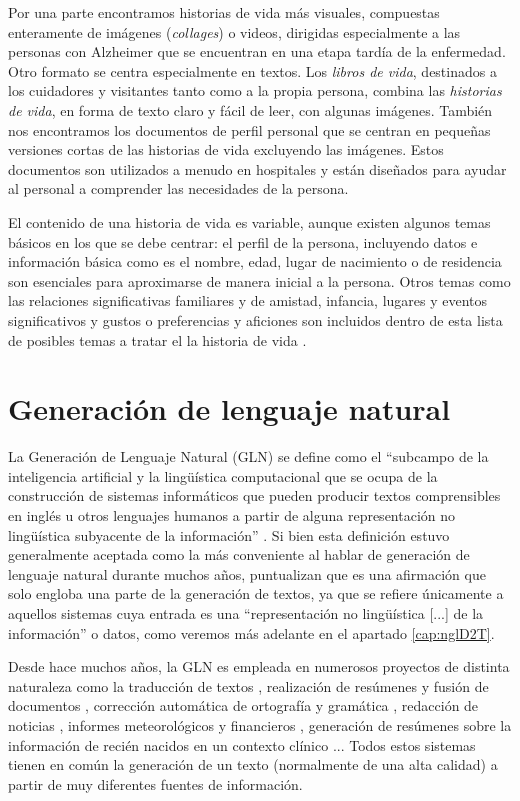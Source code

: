 Por una parte encontramos historias de vida más visuales, compuestas enteramente de imágenes (\textit{collages}) o videos, dirigidas especialmente a las personas con Alzheimer que se encuentran en una etapa tardía de la enfermedad. Otro formato se centra especialmente en textos. Los \textit{libros de vida}, destinados a los cuidadores y visitantes tanto como a la propia persona, combina las \textit{historias de vida}, en forma de texto claro y fácil de leer, con algunas imágenes. También nos encontramos los documentos de perfil personal que se centran en pequeñas versiones cortas de las historias de vida excluyendo las imágenes. Estos documentos son utilizados a menudo en hospitales y están diseñados para ayudar al personal a comprender las necesidades de la persona.

El contenido de una historia de vida es variable, aunque existen algunos temas básicos en los que se debe centrar: el perfil de la persona, incluyendo datos e información básica como es el nombre, edad, lugar de nacimiento o de residencia son esenciales para aproximarse de manera inicial a la persona. Otros temas como las relaciones significativas familiares y de amistad, infancia, lugares y eventos significativos y gustos o preferencias y aficiones son incluidos dentro de esta lista de posibles temas a tratar el la historia de vida \citep{thompsonlifestory}.

\section{Generación de lenguaje natural}

La Generación de Lenguaje Natural (GLN) se define como el ``subcampo de la inteligencia artificial y la lingüística computacional que se ocupa de la construcción de sistemas informáticos que pueden producir textos comprensibles en inglés u otros lenguajes humanos a partir de alguna representación no lingüística subyacente de la información''  \citep{reiter1997building}. Si bien esta definición estuvo generalmente aceptada como la más conveniente al hablar de generación de lenguaje natural durante muchos años, \cite{gatt2018survey} puntualizan que es una afirmación que solo engloba una parte de la generación de textos, ya que se refiere únicamente a aquellos sistemas cuya entrada es una ``representación no lingüística [...] de la información'' o datos, como veremos más adelante en el apartado \ref{cap:nglD2T}.

Desde hace muchos años, la GLN es empleada en numerosos proyectos de distinta naturaleza como la traducción de textos \citep{Cho2014LearningPR}, realización de resúmenes y fusión de documentos \citep{clarke2010discourse}, corrección automática de ortografía y gramática \citep{islam2018bangla}, redacción de noticias \citep{leppanen2017data}, informes meteorológicos \citep{sripada2014case} y financieros \citep{ren2021hybrid}, generación de resúmenes sobre la información de recién nacidos en un contexto clínico \citep{BabyTalk}... Todos estos sistemas tienen en común la generación de un texto (normalmente de una alta calidad) a partir de muy diferentes fuentes de información.

